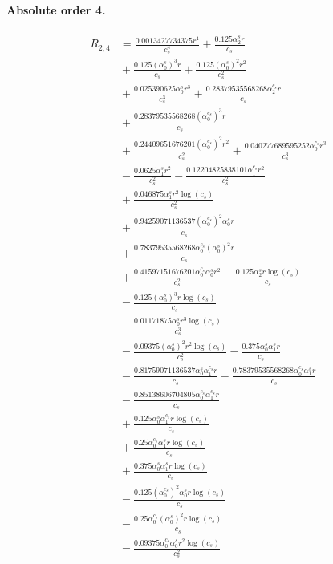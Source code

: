 \documentclass[10pt]{article}
\begin{document}
\paragraph{Absolute order 4.}
\begin{align*}
R_{2,4} &= \frac{0.0013427734375 r^{4}}{c_{s}^{4}} + \frac{0.125 \alpha_{2}^s r}{c_{s}} \\
&{}  + \frac{0.125 \left(\alpha_{0}^s\right)^{3} r}{c_{s}} + \frac{0.125 \left(\alpha_{0}^s\right)^{2} r^{2}}{c_{s}^{2}} \\
&{}  + \frac{0.025390625 \alpha_{0}^s r^{3}}{c_{s}^{3}} + \frac{0.28379535568268 \alpha_{2}^{c_s} r}{c_{s}} \\
&{}  + \frac{0.28379535568268 \left(\alpha_{0}^{c_s}\right)^{3} r}{c_{s}} \\
&{}  + \frac{0.24409651676201 \left(\alpha_{0}^{c_s}\right)^{2} r^{2}}{c_{s}^{2}} + \frac{0.040277689595252 \alpha_{0}^{c_s} r^{3}}{c_{s}^{3}} \\
&{}  - \frac{0.0625 \alpha_{1}^s r^{2}}{c_{s}^{2}} - \frac{0.12204825838101 \alpha_{1}^{c_s} r^{2}}{c_{s}^{2}} \\
&{}  + \frac{0.046875 \alpha_{1}^s r^{2} \log{\left(c_{s} \right)}}{c_{s}^{2}} \\
&{}  + \frac{0.94259071136537 \left(\alpha_{0}^{c_s}\right)^{2} \alpha_{0}^s r}{c_{s}} \\
&{}  + \frac{0.78379535568268 \alpha_{0}^{c_s} \left(\alpha_{0}^s\right)^{2} r}{c_{s}} \\
&{}  + \frac{0.41597151676201 \alpha_{0}^{c_s} \alpha_{0}^s r^{2}}{c_{s}^{2}} - \frac{0.125 \alpha_{2}^s r \log{\left(c_{s} \right)}}{c_{s}} \\
&{}  - \frac{0.125 \left(\alpha_{0}^s\right)^{3} r \log{\left(c_{s} \right)}}{c_{s}} \\
&{}  - \frac{0.01171875 \alpha_{0}^s r^{3} \log{\left(c_{s} \right)}}{c_{s}^{3}} \\
&{}  - \frac{0.09375 \left(\alpha_{0}^s\right)^{2} r^{2} \log{\left(c_{s} \right)}}{c_{s}^{2}} - \frac{0.375 \alpha_{0}^s \alpha_{1}^s r}{c_{s}} \\
&{}  - \frac{0.81759071136537 \alpha_{0}^s \alpha_{1}^{c_s} r}{c_{s}} - \frac{0.78379535568268 \alpha_{0}^{c_s} \alpha_{1}^s r}{c_{s}} \\
&{}  - \frac{0.85138606704805 \alpha_{0}^{c_s} \alpha_{1}^{c_s} r}{c_{s}} \\
&{}  + \frac{0.125 \alpha_{0}^s \alpha_{1}^{c_s} r \log{\left(c_{s} \right)}}{c_{s}} \\
&{}  + \frac{0.25 \alpha_{0}^{c_s} \alpha_{1}^s r \log{\left(c_{s} \right)}}{c_{s}} \\
&{}  + \frac{0.375 \alpha_{0}^s \alpha_{1}^s r \log{\left(c_{s} \right)}}{c_{s}} \\
&{}  - \frac{0.125 \left(\alpha_{0}^{c_s}\right)^{2} \alpha_{0}^s r \log{\left(c_{s} \right)}}{c_{s}} \\
&{}  - \frac{0.25 \alpha_{0}^{c_s} \left(\alpha_{0}^s\right)^{2} r \log{\left(c_{s} \right)}}{c_{s}} \\
&{}  - \frac{0.09375 \alpha_{0}^{c_s} \alpha_{0}^s r^{2} \log{\left(c_{s} \right)}}{c_{s}^{2}}
\end{align*}
\end{document}
